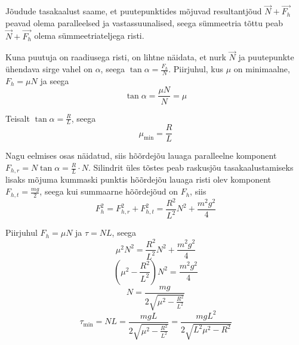 Jõudude tasakaalust saame, et puutepunktides mõjuvad resultantjõud $\vec N + \vec{F_h}$ peavad olema paralleelsed ja vastassuunalised, seega sümmeetria tõttu peab $\vec N + \vec{F_h}$ olema sümmeetriateljega risti.

Kuna puutuja on raadiusega risti, on lihtne näidata, et nurk $\vec N$ ja puutepunkte ühendava sirge vahel on $\alpha$, seega $\tan \alpha = \frac{F_h}{N}$. Piirjuhul, kus $\mu$ on minimaalne, $F_h = \mu N$ ja seega
$$\tan \alpha = \frac{\mu N}{N} = \mu$$

Teisalt $\tan \alpha = \frac{R}{L}$, seega
$$\mu_\text{min} = \frac{R}{L}$$

\osa Nagu eelmises osas näidatud, siis hõõrdejõu lauaga paralleelne komponent $F_{h,r} = N\tan \alpha = \frac{R}{L}\cdot N$. Silindrit üles tõstes peab raskusjõu tasakaalustamiseks lisaks mõjuma kummaski punktis hõõrdejõu lauaga risti olev komponent $F_{h,t} = \frac{mg}{2}$, seega kui summaarne hõõrdejõud on $F_h$, siis
$$F_h^2 = F_{h,r}^2 + F_{h,t}^2 = \frac{R^2}{L^2}N^2 + \frac{m^2g^2}{4}$$

Piirjuhul $F_h = \mu N$ ja $\tau = NL$, seega
$$\mu^2N^2 = \frac{R^2}{L^2}N^2 + \frac{m^2g^2}{4}$$
$$\left(\mu^2 - \frac{R^2}{L^2}\right)N^2 = \frac{m^2g^2}{4}$$
$$N = \frac{mg}{2\sqrt{\mu^2-\frac{R^2}{L^2}}}$$
$$\tau_\text{min} = NL = \frac{mgL}{2\sqrt{\mu^2-\frac{R^2}{L^2}}} = \frac{mgL^2}{2\sqrt{L^2\mu^2 - R^2}}$$
\probend